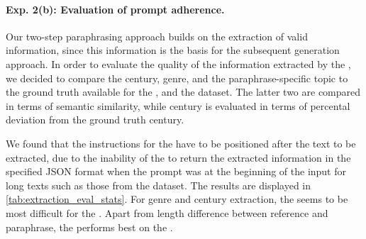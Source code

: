 


\paragraph{Exp. 2(b): Evaluation of prompt adherence.}
Our two-step paraphrasing approach builds on the extraction of valid information, since this information is the basis for the subsequent generation approach.
In order to evaluate the quality of the information extracted by the \pextractor{}, we decided to compare the century, genre, and the paraphrase-specific topic to the ground truth available for the \dataBlog{}, \dataGutenberg{} and the \dataStudent{} dataset.
The latter two are compared in terms of semantic similarity, while century is evaluated in terms of percental deviation from the ground truth century.

We found that the instructions for the \pextractor{} have to be positioned after the text to be extracted, due to the inability of the \pextractor{} to return the extracted information in the specified JSON format when the prompt was at the beginning of the input for long texts such as those from the \dataGutenberg{} dataset.
The results are displayed in \autoref{tab:extraction_eval_stats}.
For genre and century extraction, the \dataStudent{} seems to be most difficult for the \pextractor{}.
Apart from length difference between reference and paraphrase, the \pextractor{} performs best on the \dataGutenberg{}.

